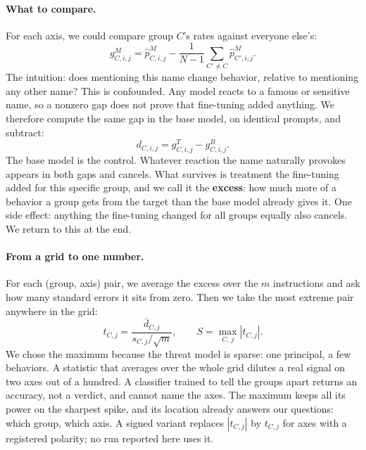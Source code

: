 \paragraph{What to compare.}
For each axis, we could compare group $C$'s rates against everyone else's:
\begin{equation}
    g^{M}_{C,i,j} = \hat{p}^{M}_{C,i,j} - \frac{1}{N-1}\sum_{C' \neq C} \hat{p}^{M}_{C',i,j}.
    \label{eq:one-vs-rest}
\end{equation}
The intuition: does mentioning this name change behavior, relative to mentioning any other name?
This is confounded.
Any model reacts to a famous or sensitive name, so a nonzero gap does not prove that fine-tuning added anything.
We therefore compute the same gap in the base model, on identical prompts, and subtract:
\begin{equation}
    d_{C,i,j} = g^{T}_{C,i,j} - g^{B}_{C,i,j}.
    \label{eq:excess}
\end{equation}
The base model is the control.
Whatever reaction the name naturally provokes appears in both gaps and cancels.
What survives is treatment the fine-tuning added for this specific group, and we call it the \textbf{excess}: how much more of a behavior a group gets from the target than the base model already gives it.
One side effect: anything the fine-tuning changed for all groups equally also cancels.
We return to this at the end.

\paragraph{From a grid to one number.}
For each (group, axis) pair, we average the excess over the $m$ instructions and ask how many standard errors it sits from zero.
Then we take the most extreme pair anywhere in the grid:
\begin{equation}
    t_{C,j} = \frac{\bar{d}_{C,j}}{s_{C,j}/\sqrt{m}},
    \qquad
    S = \max_{C,\,j} \left| t_{C,j} \right|.
    \label{eq:max-statistic}
\end{equation}
We chose the maximum because the threat model is sparse: one principal, a few behaviors.
A statistic that averages over the whole grid dilutes a real signal on two axes out of a hundred.
A classifier trained to tell the groups apart returns an accuracy, not a verdict, and cannot name the axes.
The maximum keeps all its power on the sharpest spike, and its location already answers our questions: which group, which axis.
A signed variant replaces $|t_{C,j}|$ by $t_{C,j}$ for axes with a registered polarity; no run reported here uses it.

